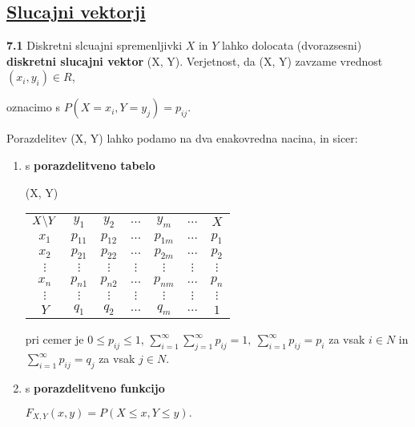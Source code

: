 \documentclass{article}
\begin{document}
\begin{multicols}{3}
\section{\underline{Slucajni vektorji}}

\textbf{7.1} Diskretni slcuajni spremenljivki $X$ in $Y$  lahko
dolocata (dvorazsesni) \textbf{diskretni slucajni vektor} (X, Y).
Verjetnost, da (X, Y) zavzame vrednost $(x_i, y_i) \in R$,

\begin{center}
    oznacimo s $P(X = x_i, Y = y_j) = p_{ij}$.
\end{center}

Porazdelitev (X, Y) lahko podamo na dva enakovredna nacina, in sicer:

\begin{enumerate}
    \item s \textbf{porazdelitveno tabelo}
        \begin{center}
            \begin{tiny}
                (X, Y)
                \begin{tabular}{ |c|c|c|c|c|c|c| } 
                    \hline
                        $ X \symbol{92} Y $ & $y_1$ & $y_2$ & $\dots$ & $y_m$ & $\dots$ & $X$ \\
                        \cline{1-7}
                        $x_1$ & $p_{11}$ & $p_{12}$ & $\dots$ & $p_{1m}$ & $\dots$ & $p_1$ \\
                        $x_2$ & $p_{21}$ & $p_{22}$ & $\dots$ & $p_{2m}$ & $\dots$ & $p_2$ \\
                        $\vdots$ & $\vdots$ & $\vdots$ & $\vdots$ & $\vdots $ & $\vdots$ & $\vdots$ \\
                        $x_n$ & $p_{n1}$ & $p_{n2}$ & $\dots$ & $p_{nm}$ & $\dots$ & $p_n$ \\
                        $\vdots$ & $\vdots$ & $\vdots$ & $\vdots$ & $\vdots $ & $\vdots$ & $\vdots$ \\
                        \cline{1-7}
                        $ Y $ & $q_1$ & $q_2$ & $\dots$ & $q_m$ & $\dots$ & $1$ \\
                    \hline
                    \end{tabular}
            \end{tiny}
        \end{center}
        pri cemer je $0 \leq p_{ij} \leq 1$,
        \begin{math}
            \sum_{i = 1}^{\infty} \sum_{j = 1}^{\infty} p_{ij} = 1,\:
            \sum_{i = 1}^{\infty} p_{ij} = p_i
        \end{math} za vsak $i \in N$ in
        \begin{math}
            \sum_{i = 1}^{\infty} p_{ij} = q_j
        \end{math} za vsak $j \in N$.
    \item s \textbf{porazdelitveno funkcijo}
        \begin{center}
            \begin{math}
                F_{X,Y}(x, y) = P(X \leq x, Y \leq y).
            \end{math}
            

\end{center}
\end{enumerate}
\end{multicols}
\end{document}
